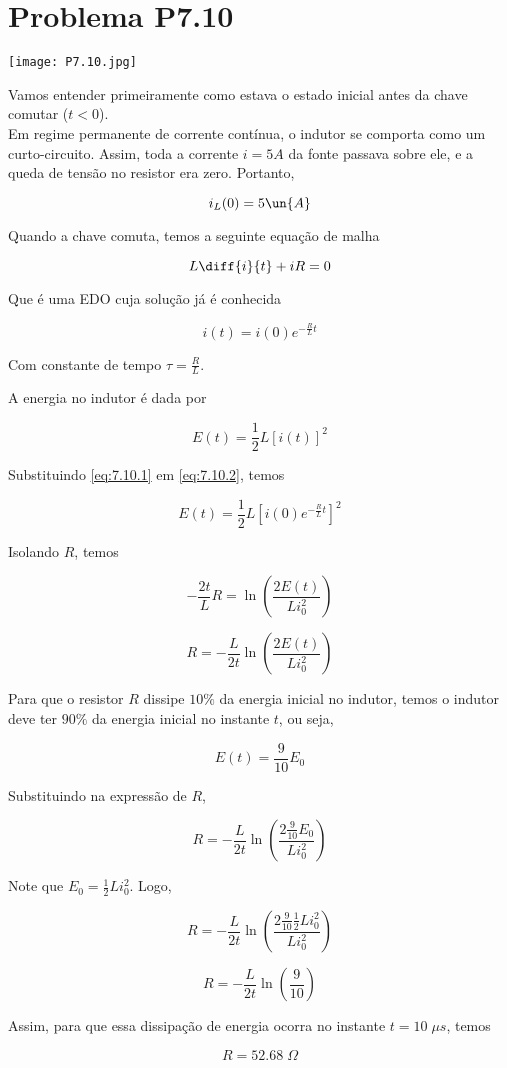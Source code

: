
\section*{Problema P7.10}

\renewcommand*\thesection{7.10}

\begin{center}
    \texttt{[image: P7.10.jpg]}
\end{center}


Vamos entender primeiramente como estava o estado inicial antes da chave comutar ($t < 0$). \\
Em regime permanente de corrente contínua, o indutor se comporta como um curto-circuito. Assim,
toda a corrente $i = 5A$ da fonte passava sobre ele, e a queda de tensão no resistor era zero. Portanto,

\[ i_L(0) = 5 \un{A} \]

Quando a chave comuta, temos a seguinte equação de malha

\[ L\diff{i}{t} + iR = 0 \]

Que é uma EDO cuja solução já é conhecida 

\begin{equation}\label{eq:7.10.1}
    i(t) = i(0)e^{-\frac{R}{L}t}
\end{equation}

Com constante de tempo $\tau = \frac{R}{L}$.

A energia no indutor é dada por 

\begin{equation}\label{eq:7.10.2}
    E(t) = \frac{1}{2}L[i(t)]^2
\end{equation}

Substituindo \eqref{eq:7.10.1} em \eqref{eq:7.10.2}, temos

\[ E(t) = \frac{1}{2}L[i(0)e^{-\frac{R}{L}t}]^2 \]

Isolando $R$, temos 
 
\[ -\frac{2t}{L}R = \ln\left(\frac{2E(t)}{Li_0^2}\right) \]

\[ R = -\frac{L}{2t} \ln\left(\frac{2E(t)}{Li_0^2}\right) \]

Para que o resistor $R$ dissipe $10\%$ da energia inicial no indutor, temos o indutor deve ter $90\%$ da energia inicial no instante
$t$, ou seja, 

\[ E(t) = \frac{9}{10}E_0  \]

Substituindo na expressão de $R$,

\[ R = -\frac{L}{2t} \ln\left(\frac{2\frac{9}{10}E_0}{Li_0^2}\right) \]

Note que $E_0 = \frac{1}{2}Li_0^2$. Logo,

\[ R = -\frac{L}{2t} \ln\left(\frac{2\frac{9}{10}\frac{1}{2}Li_0^2}{Li_0^2}\right) \]

\[ R = -\frac{L}{2t} \ln\left(\frac{9}{10}\right) \]

Assim, para que essa dissipação de energia ocorra no instante $t = 10\;\mu s$, temos 

\[ \boxed{R = 52.68 \;\Omega}  \]



